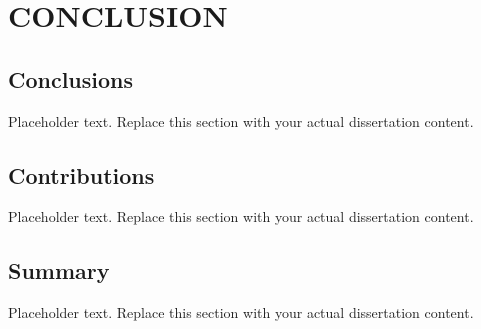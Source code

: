 
\chapter{CONCLUSION}

\section{Conclusions}
Placeholder text. Replace this section with your actual dissertation content.

\section{Contributions}
Placeholder text. Replace this section with your actual dissertation content.

\section{Summary}
Placeholder text. Replace this section with your actual dissertation content.
